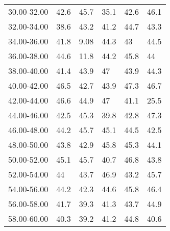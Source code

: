 \begin{sidewaystable}[]
\begin{tabular}{llllll}
		30.00-32.00 & 42.6             & 45.7             & 35.1             & 42.6             & 46.1             \\
		32.00-34.00 & 38.6             & 43.2             & 41.2             & 44.7             & 43.3             \\
		34.00-36.00 & 41.8             & 9.08             & 44.3             & 43               & 44.5             \\
		36.00-38.00 & 44.6             & 11.8             & 44.2             & 45.8             & 44               \\
		38.00-40.00 & 41.4             & 43.9             & 47               & 43.9             & 44.3             \\
		40.00-42.00 & 46.5             & 42.7             & 43.9             & 47.3             & 46.7             \\
		42.00-44.00 & 46.6             & 44.9             & 47               & 41.1             & 25.5             \\
		44.00-46.00 & 42.5             & 45.3             & 39.8             & 42.8             & 47.3             \\
		46.00-48.00 & 44.2             & 45.7             & 45.1             & 44.5             & 42.5             \\
		48.00-50.00 & 43.8             & 42.9             & 45.8             & 45.3             & 44.1             \\
		50.00-52.00 & 45.1             & 45.7             & 40.7             & 46.8             & 43.8             \\
		52.00-54.00 & 44               & 43.7             & 46.9             & 43.2             & 45.7             \\
		54.00-56.00 & 44.2             & 42.3             & 44.6             & 45.8             & 46.4             \\
		56.00-58.00 & 41.7             & 39.3             & 41.3             & 43.7             & 44.9             \\
		58.00-60.00 & 40.3             & 39.2             & 41.2             & 44.8             & 40.6            
	\end{tabular}
\end{sidewaystable}

